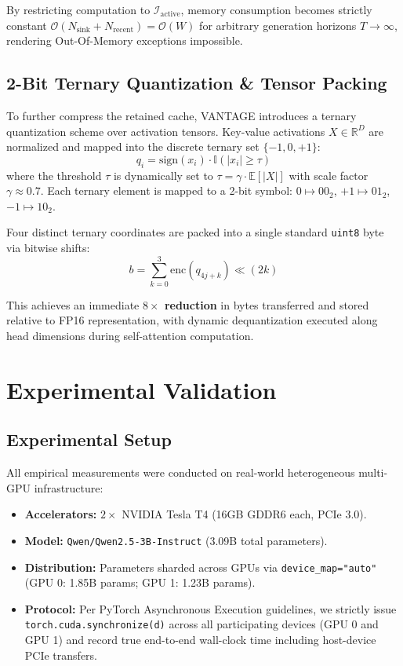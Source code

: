 \documentclass[10pt,twocolumn,letterpaper]{article}
\begin{document}
By restricting computation to $\mathcal{I}_{\text{active}}$, memory consumption becomes strictly constant $\mathcal{O}(N_{\text{sink}} + N_{\text{recent}}) = \mathcal{O}(W)$ for arbitrary generation horizons $T \to \infty$, rendering Out-Of-Memory exceptions impossible.

\subsection{2-Bit Ternary Quantization \& Tensor Packing}
To further compress the retained cache, VANTAGE introduces a ternary quantization scheme over activation tensors. Key-value activations $X \in \mathbb{R}^D$ are normalized and mapped into the discrete ternary set $\{-1, 0, +1\}$:
\begin{equation}
q_i = \text{sign}(x_i) \cdot \mathbb{I}(|x_i| \ge \tau)
\end{equation}
where the threshold $\tau$ is dynamically set to $\tau = \gamma \cdot \mathbb{E}[|X|]$ with scale factor $\gamma \approx 0.7$. Each ternary element is mapped to a 2-bit symbol: $0 \mapsto 00_2$, $+1 \mapsto 01_2$, $-1 \mapsto 10_2$.

Four distinct ternary coordinates are packed into a single standard \texttt{uint8} byte via bitwise shifts:
\begin{equation}
b = \sum_{k=0}^{3} \text{enc}(q_{4j+k}) \ll (2k)
\end{equation}

This achieves an immediate \textbf{$8\times$ reduction} in bytes transferred and stored relative to FP16 representation, with dynamic dequantization executed along head dimensions during self-attention computation.

\section{Experimental Validation}

\subsection{Experimental Setup}
All empirical measurements were conducted on real-world heterogeneous multi-GPU infrastructure:
\begin{itemize}
    \item \textbf{Accelerators:} $2\times$ NVIDIA Tesla T4 (16GB GDDR6 each, PCIe 3.0).
    \item \textbf{Model:} \texttt{Qwen/Qwen2.5-3B-Instruct} (3.09B total parameters).
    \item \textbf{Distribution:} Parameters sharded across GPUs via \texttt{device\_map="auto"} (GPU 0: 1.85B params; GPU 1: 1.23B params).
    \item \textbf{Protocol:} Per PyTorch Asynchronous Execution guidelines, we strictly issue \texttt{torch.cuda.synchronize(d)} across all participating devices (GPU 0 and GPU 1) and record true end-to-end wall-clock time including host-device PCIe transfers.
\end{itemize}
\end{document}
